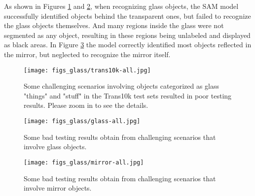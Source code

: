 \documentclass{article}
\begin{document}
As shown in Figures \ref{tarans1-k} and \ref{glass-all}, when recognizing glass objects, the SAM model successfully identified objects behind the transparent ones, but failed to recognize the glass objects themselves. And many regions inside the glass were not segmented as any object, resulting in these regions being unlabeled and displayed as black areas. In Figure \ref{mirror-all} the model correctly identified most objects reflected in the mirror, but neglected to recognize the mirror itself.

\begin{figure}
\centering
\texttt{[image: figs\_glass/trans10k-all.jpg]}
\caption{Some challenging scenarios involving objects categorized as glass "things" and "stuff" in the Trans10k test sets resulted in poor testing results. Please zoom in to see the details.}
  \label{tarans1-k} 
\end{figure}

\begin{figure}
\centering
\texttt{[image: figs\_glass/glass-all.jpg]}
\caption{Some bad testing results obtain from challenging scenarios that involve glass objects.}
  \label{glass-all} 
\end{figure}
\begin{figure}
\centering
\texttt{[image: figs\_glass/mirror-all.jpg]}
\caption{Some bad testing results obtain from challenging scenarios that involve mirror objects.}
  \label{mirror-all} 
\end{figure}
\end{document}
